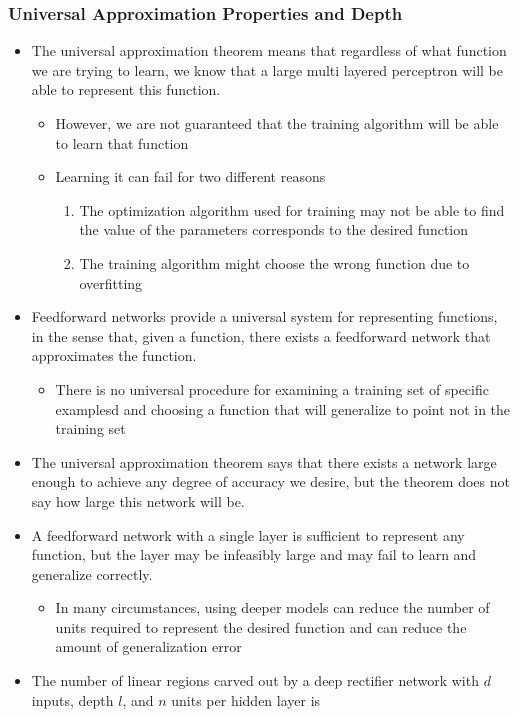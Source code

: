 \documentclass[11pt]{article}
\begin{document}
\subsubsection{Universal Approximation Properties and Depth}
\label{sec:org1f9154f}
\begin{itemize}
\item The universal approximation theorem means that regardless of what function we are trying to learn, we know that a large multi layered perceptron will be able to represent this function.
\begin{itemize}
\item However, we are not guaranteed that the training algorithm will be able to learn that function
\item Learning it can fail for two different reasons
\begin{enumerate}
\item The optimization algorithm used for training may not be able to find the value of the parameters corresponds to the desired function
\item The training algorithm might choose the wrong function due to overfitting
\end{enumerate}
\end{itemize}

\item Feedforward networks provide a universal system for representing functions, in the sense that, given a function, there exists a feedforward network that approximates the function.
\begin{itemize}
\item There is no universal procedure for examining a training set of specific examplesd and choosing a function that will generalize to point not in the training set
\end{itemize}

\item The universal approximation theorem says that there exists a network large enough to achieve any degree of accuracy we desire, but the theorem does not say how large this network will be.

\item A feedforward network with a single layer is sufficient to represent any function, but the layer may be infeasibly large and may fail to learn and generalize correctly.
\begin{itemize}
\item In many circumstances, using deeper models can reduce the number of units required to represent the desired function and can reduce the amount of generalization error
\end{itemize}

\item The number of linear regions carved out by a deep rectifier network with \(d\) inputs, depth \(l\), and \(n\) units per hidden layer is
\end{itemize}
\end{document}
